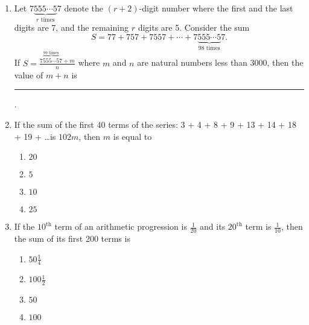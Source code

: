 \begin{enumerate}    [label=\thesubsection.\arabic*, ref=\thesubsection.\theenumi]
\begin{enumerate}		
\item     $(I)\to(T);(II)\to(C);(III)\to(D);(IV)\to(T)$
\item     $(I)\to(B);(II)\to(D);(III)\to(D);(IV)\to(C)$   
\item     $(I)\to(B);(II)\to(C);(III)\to(A);(IV)\to(C)$
\item     $(I)\to(T);(II)\to(D);(III)\to(A);(IV)\to(T)$
\end{enumerate}
\item  Let $ {7\underbrace{555\cdots5}_{r \text{ times}}7} $ denote the \( (r+2) \)-digit number where the first and the last digits are 7, and the remaining \( r \) digits are 5. Consider the sum $$S =77 + 757 + 7557 + \cdots + 7\underbrace{555\cdots5}_{98 \text{ times}}7.$$ If $ S = \frac{7\overbrace{555\cdots5}^{99 \text{ times}}7+m}{n} $ where \( m \) and \( n \) are natural numbers less than 3000, then the value of \( m + n \) is \rule{1cm}{0.1pt}.
	\hfill {}
\item If the sum of the first 40 terms of the series: 3 + 4 + 8 + 9 + 13 + 14 + 18 + 19 + \dots is $102m$, then $m$ is equal to
	\hfill {}
		\begin{multicols}{4}
\begin{enumerate}
   \item $20$
   \item $5$
   \item $10$
   \item $25$
\end{enumerate}
                                         \end{multicols} 
					 \item If the $10^{\text{th}}$ term of an arithmetic progression is $\frac{1}{20}$ and its $20^{\text{th}}$ term is $\frac{1}{10}$, then the sum of its first 200 terms is
		\begin{multicols}{4}
\begin{enumerate}
    \item $50 \frac{1}{4}$
    \item $100 \frac{1}{2}$
    \item $50$
    \item $100$
\end{enumerate}
                                         \end{multicols} 
\end{enumerate}
